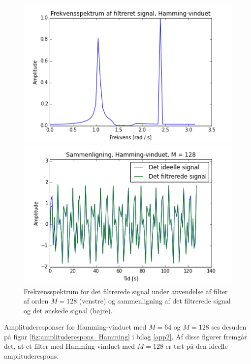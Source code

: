 \begin{figure}[H]
\begin{minipage}{0.49\textwidth}
\centering
\includegraphics[width=\textwidth]{figures/Filter/freq_filt_signal_Hamming.png}
\end{minipage}
\begin{minipage}{0.49\textwidth}
\centering
\includegraphics[width=\textwidth]{figures/Filter/signal_compare_Hamming.png}
\end{minipage}
\caption{Frekvensspektrum for det filtrerede signal under anvendelse af filter af orden $M=128$ (venstre) og sammenligning af det filtrerede signal og det ønskede signal (højre).}
\label{fig:resultat}
\end{figure}

Amplituderesponser for Hamming-vinduet med $M = 64$ og $M = 128$ ses desuden på figur \ref{fig:amplituderespons_Hamming} i bilag \ref{app2}. Af disse figurer fremgår det, at et filter med Hamming-vinduet med $M = 128$ er tæt på den ideelle amplituderespons.

